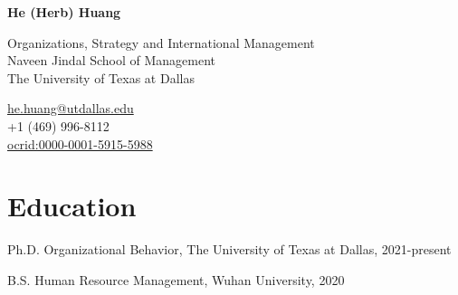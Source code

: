 \documentclass[12pt,letterpaper]{report} %
\newcommand{\myname}{He (Herb) Huang}
\newcommand{\namefont}[1]{{\normalfont\bfseries\Large{#1}}}
\begin{document}
    \raggedright{}

    \begin{center}\namefont{\myname}\end{center}

    \vspace{1em}
    \begin{minipage}[t]{0.700\textwidth}
        Organizations, Strategy and International Management \\
        Naveen Jindal School of Management \\
        The University of Texas at Dallas
    \end{minipage}
    \begin{minipage}[t]{0.295\textwidth}
        \flushright{}
        \href{mailto:he.huang@utdallas.edu}{he.huang@utdallas.edu} \\
        +1 (469) 996-8112 \\
        \href{https://orcid.org/0000-0001-5915-5988}{ocrid:0000-0001-5915-5988}
    \end{minipage}


    \section*{Education}

    \begin{tablist}

        \item[Ph.D.]\tab{}Organizational Behavior, The University of Texas at Dallas, 2021-present
        \item[B.S.] \tab{}Human Resource Management, Wuhan University, 2020

    \end{tablist}





\end{document}
